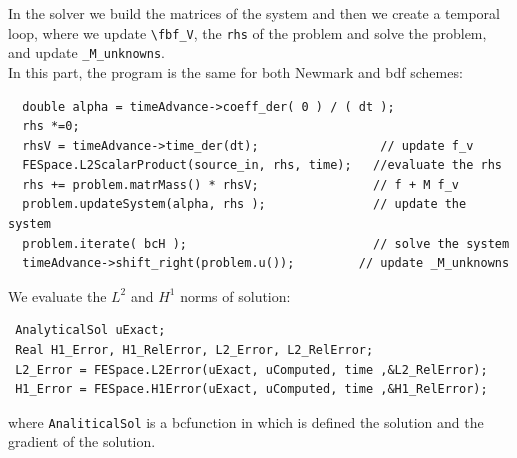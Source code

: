 \documentclass[english,a4paper]{article}
\newcommand{\fbf}{\text{\mbox{\boldmath $f$}}}
\begin{document}
In the solver we build the matrices of the  system and then we create a
temporal loop, where we update \verb"\fbf_V", the \verb"rhs" of the problem and
solve the problem, and update \verb"_M_unknowns".\\
In this part, the program is the same for both  Newmark and bdf schemes:
\begin{verbatim}
  double alpha = timeAdvance->coeff_der( 0 ) / ( dt );
  rhs *=0;
  rhsV = timeAdvance->time_der(dt);                 // update f_v
  FESpace.L2ScalarProduct(source_in, rhs, time);   //evaluate the rhs
  rhs += problem.matrMass() * rhsV;                // f + M f_v
  problem.updateSystem(alpha, rhs );               // update the system
  problem.iterate( bcH );                          // solve the system
  timeAdvance->shift_right(problem.u());         // update _M_unknowns
\end{verbatim}

We evaluate the $L^2$ and $H^1$ norms
of solution:
\begin{verbatim}
 AnalyticalSol uExact;
 Real H1_Error, H1_RelError, L2_Error, L2_RelError;
 L2_Error = FESpace.L2Error(uExact, uComputed, time ,&L2_RelError);
 H1_Error = FESpace.H1Error(uExact, uComputed, time ,&H1_RelError);
\end{verbatim}
where \verb"AnaliticalSol" is a
bcfunction in which is defined the
solution and the gradient of  the solution.\\
\end{document}
